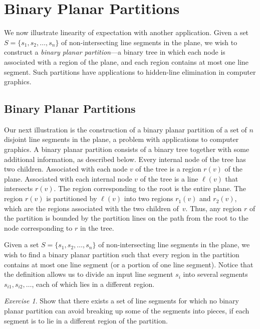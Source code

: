 \documentclass[twoside,12pt]{book}
\theoremstyle{plain}
\theoremstyle{definition}
\theoremstyle{remark}
\newtheorem{exercise}[theorem]{Exercise}
\begin{document}
\section{Binary Planar Partitions}
\label{sec:bpp}

We now illustrate linearity of expectation with another application. Given a
set $S=\{s_1,s_2,\ldots,s_n\}$ of non-intersecting line segments in the
plane, we wish to construct a \emph{binary planar partition}---a binary
tree in which each node is associated with a region of the plane, and each
region contains at most one line segment. Such partitions have applications
to hidden-line elimination in computer graphics.

\subsection{Binary Planar Partitions}

Our next illustration is the construction of a binary planar partition of a
set of $n$ disjoint line segments in the plane, a problem with applications
to computer graphics.  A binary planar partition consists of a binary tree
together with some additional information, as described below.  Every internal
node of the tree has two children.  Associated with each node $v$ of the tree
is a region $r(v)$ of the plane.  Associated with each internal node $v$ of
the tree is a line $\ell(v)$ that intersects $r(v)$.  The region
corresponding to the root is the entire plane.  The region $r(v)$ is
partitioned by $\ell(v)$ into two regions $r_1(v)$ and $r_2(v)$, which are
the regions associated with the two children of~$v$.  Thus, any region $r$ of
the partition is bounded by the partition lines on the path from the root to
the node corresponding to $r$ in the tree.

Given a set $S=\{s_1,s_2,\ldots,s_n\}$ of non-intersecting line segments
in the plane, we wish to find a binary planar partition such that every
region in the partition contains at most one line segment (or a portion of
one line segment).  Notice that the definition allows us to divide an input
line segment $s_i$ into several segments $s_{i1},s_{i2},\ldots$, each of
which lies in a different region.

\begin{exercise}
Show that there exists a set of line segments for which no binary planar
partition can avoid breaking up some of the segments into pieces, if each
segment is to lie in a different region of the partition.
\end{exercise}
\end{document}
